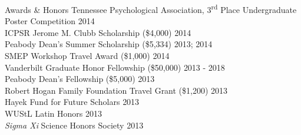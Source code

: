 \documentclass {resume}
\begin{document}
\begin{rSection}{\textrm{Awards \& Honors}}
Tennessee Psychological Association, 3\textsuperscript{rd} Place Undergraduate Poster Competition \hfill{2014}\smallskip\\
ICPSR Jerome M. Clubb Scholarship (\$4,000) \hfill{2014}\smallskip\\
Peabody Dean's Summer Scholarship (\$5,334)			    \hfill  {2013; 2014}\smallskip\\	
SMEP Workshop Travel Award (\$1,000) \hfill{2014}\smallskip\\
Vanderbilt Graduate Honor Fellowship (\$50,000)	\hfill  {2013 - 2018}\smallskip\\	
Peabody Dean's Fellowship (\$5,000)					\hfill  {2013}\smallskip\\
Robert Hogan Family Foundation Travel Grant (\$1,200) 	\hfill  {2013}\smallskip\\
Hayek Fund for Future Scholars                      \hfill  {2013}\smallskip\\
WUStL Latin Honors \hfill  {2013}\smallskip\\
\textit{Sigma Xi} Science Honors Society                    			\hfill  {2013}%
\end{rSection}
\end{document}
